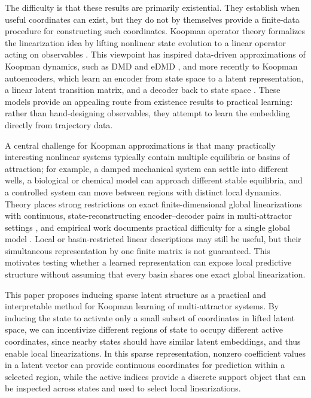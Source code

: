 \documentclass[11pt]{article}
\begin{document}
The difficulty is that these results are primarily existential.
They establish when useful coordinates can exist, but they do not by themselves provide a finite-data procedure for constructing such coordinates.
Koopman operator theory formalizes the linearization idea by lifting nonlinear
state evolution to a linear operator acting on observables \citep{koopman_hamiltonian_1931, koopman_dynamical_1932, mezic2005spectral, brunton_modern_2022}.
This viewpoint has inspired data-driven approximations of Koopman dynamics, such as DMD and eDMD \citep{schmid_dmd_2010, williams_datadriven_2015, williams_kernel-based_2016},
and more recently to Koopman autoencoders, which learn an encoder from state space to a latent representation, a linear latent transition matrix, and a decoder back to state space \citep{takeishi2017learning,lusch_deep_2018,otto2019linearly, azencot_forecasting_2020, shi_deep_2022, fathi2024course}.
These models provide an appealing route from existence results to practical learning: rather than hand-designing observables, they attempt to learn the embedding directly from trajectory data.

A central challenge for Koopman approximations is that many practically interesting nonlinear systems typically contain multiple equilibria or basins of attraction; for example, a damped mechanical system can settle into different wells, a biological or chemical model can approach different stable equilibria, and a controlled system can move between regions with distinct local dynamics.
Theory places strong restrictions on exact finite-dimensional global linearizations with continuous, state-reconstructing encoder--decoder pairs in multi-attractor settings \citep{lan_linearization_2013, brunton_koopman_2016, pan_lifting_2024,liu_properties_2025}, and empirical work documents practical difficulty for a single global model \citep{fathi2024course}.
Local or basin-restricted linear descriptions may still be useful, but their simultaneous representation by one finite matrix is not guaranteed.
This motivates testing whether a learned representation can expose local predictive structure without assuming that every basin shares one exact global linearization.

This paper proposes inducing sparse latent structure as a practical and interpretable method for Koopman learning of multi-attractor systems.
By inducing the state to activate only a small subset of coordinates in lifted latent space, we can incentivize different regions of state to occupy different active coordinates, since nearby states should have similar latent embeddings, and thus enable local linearizations.
In this sparse representation, nonzero coefficient values in a latent vector can provide continuous coordinates for prediction within a selected region, while the active indices provide a discrete support object that can be inspected across states and used to select local linearizations.
\end{document}
